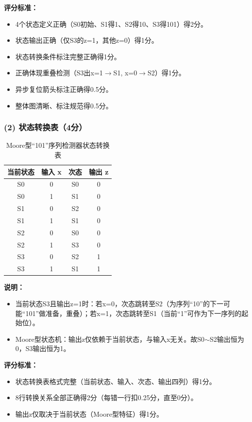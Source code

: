 \noindent\textbf{评分标准：}
\begin{itemize}
  \item 4个状态定义正确（S0初始、S1得1、S2得10、S3得101）得2分。
  \item 状态输出正确（仅S3的z=1，其他z=0）得1分。
  \item 状态转换条件标注完整正确得1分。
  \item 正确体现重叠检测（S3出x=1$\to$S1, x=0$\to$S2）得1分。
  \item 异步复位箭头标注正确得0.5分。
  \item 整体图清晰、标注规范得0.5分。
\end{itemize}


\subsubsection*{(2) 状态转换表（4分）}

\begin{table}[h]
\centering
\caption{Moore型“101”序列检测器状态转换表}
\label{tab:fsm-table}
\begin{tabular}{|c|c||c|c|}
\hline
\textbf{当前状态} & \textbf{输入 x} & \textbf{次态} & \textbf{输出 z} \\
\hline
S0 & 0 & S0 & 0 \\
S0 & 1 & S1 & 0 \\
\hline
S1 & 0 & S2 & 0 \\
S1 & 1 & S1 & 0 \\
\hline
S2 & 0 & S0 & 0 \\
S2 & 1 & S3 & 0 \\
\hline
S3 & 0 & S2 & 1 \\
S3 & 1 & S1 & 1 \\
\hline
\end{tabular}
\end{table}

\noindent\textbf{说明：}
\begin{itemize}
  \item 当前状态S3且输出z=1时：若x=0，次态跳转至S2（为序列“10”的下一可能“101”做准备，重叠）；若x=1，次态跳转至S1（当前“1”可作为下一序列的起始位）。
  \item Moore型状态机：输出z仅依赖于当前状态，与输入x无关。故S0$\sim$S2输出恒为0，S3输出恒为1。
\end{itemize}

\noindent\textbf{评分标准：}
\begin{itemize}
  \item 状态转换表格式完整（当前状态、输入、次态、输出四列）得1分。
  \item 8行转换关系全部正确得2分（每错一行扣0.25分，直至0分）。
  \item 输出z仅取决于当前状态（Moore型特征）得1分。
\end{itemize}

